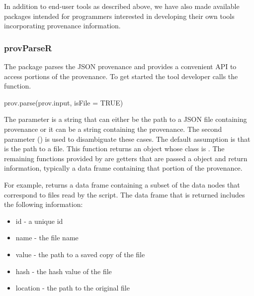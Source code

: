 In addition to end-user tools as described above, we have also made available packages intended for programmers interested in developing their own tools incorporating provenance information.


\subsubsection{provParseR}

The  package parses the JSON provenance and provides a convenient API to access portions of the provenance. To get started the tool developer calls the  function.
\begin{example}
prov.parse(prov.input, isFile = TRUE)
\end{example}
%

The  parameter is a string that can either be the path to a JSON file containing provenance or it can be a string containing the provenance.  The second parameter () is used to disambiguate these cases.  The default assumption is that  is the path to a file.  This function returns an object whose class is . The remaining functions provided by  are getters that are passed a  object and return information, typically a data frame containing that portion of the provenance.

For example,  returns a data frame containing a subset of the data nodes that correspond to files read by the script.  The data frame that is returned includes the following information:

\begin{itemize}
    \item id - a unique id
    \item name - the file name
    \item value - the path to a saved copy of the file
    \item hash - the hash value of the file
    \item location - the path to the original file
\end{itemize}

